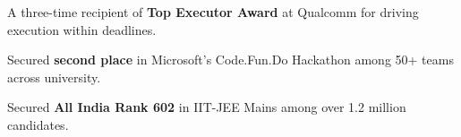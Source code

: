 \documentclass[letterpaper,11pt]{article}
\makeatletter
\newcommand{\resumeItem}[1]{
  \item\small{
    {#1 \vspace{-2pt}}
  }
}
\newcommand{\resumeSubSubheading}[2]{
    \vspace{-2pt}\item
    \begin{tabular*}{1.0\textwidth}{l@{\extracolsep{\fill}}r}
      \textit{#1} & \textit{#2} \\
    \end{tabular*}\vspace{-7pt}
}
\newcommand{\resumeSubHeadingListStart}{\begin{itemize}[leftmargin=0.0in, label={}]}
\newcommand{\resumeSubHeadingListEnd}{\end{itemize}}
\newcommand{\resumeItemListStart}{\begin{itemize}}
\newcommand{\resumeItemListEnd}{\end{itemize}\vspace{-5pt}}
\makeatother
\begin{document}
            \resumeItem{A three-time recipient of \textbf{Top Executor Award} at Qualcomm for driving execution within deadlines.}
            
             \resumeItem{Secured \textbf{second place }in Microsoft's Code.Fun.Do Hackathon among 50+ teams across university.}
             
            \resumeItem{Secured \textbf{All India Rank 602} in IIT-JEE  Mains among over 1.2 million candidates. }
            
  
\end{document}
